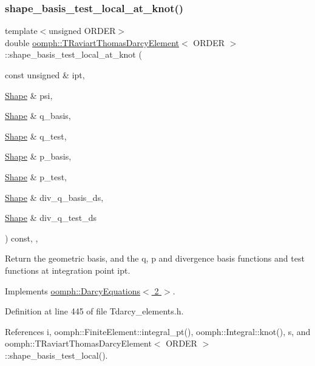 \subsubsection{\texorpdfstring{shape\+\_\+basis\+\_\+test\+\_\+local\+\_\+at\+\_\+knot()}{shape\_basis\_test\_local\_at\_knot()}}
{\footnotesize\ttfamily template$<$unsigned O\+R\+D\+ER$>$ \\
double \hyperlink{classoomph_1_1TRaviartThomasDarcyElement}{oomph\+::\+T\+Raviart\+Thomas\+Darcy\+Element}$<$ O\+R\+D\+ER $>$\+::shape\+\_\+basis\+\_\+test\+\_\+local\+\_\+at\+\_\+knot (\begin{DoxyParamCaption}\item[{const unsigned \&}]{ipt,  }\item[{\hyperlink{classoomph_1_1Shape}{Shape} \&}]{psi,  }\item[{\hyperlink{classoomph_1_1Shape}{Shape} \&}]{q\+\_\+basis,  }\item[{\hyperlink{classoomph_1_1Shape}{Shape} \&}]{q\+\_\+test,  }\item[{\hyperlink{classoomph_1_1Shape}{Shape} \&}]{p\+\_\+basis,  }\item[{\hyperlink{classoomph_1_1Shape}{Shape} \&}]{p\+\_\+test,  }\item[{\hyperlink{classoomph_1_1Shape}{Shape} \&}]{div\+\_\+q\+\_\+basis\+\_\+ds,  }\item[{\hyperlink{classoomph_1_1Shape}{Shape} \&}]{div\+\_\+q\+\_\+test\+\_\+ds }\end{DoxyParamCaption}) const\hspace{0.3cm}{\ttfamily [inline]}, {\ttfamily [protected]}, {\ttfamily [virtual]}}



Return the geometric basis, and the q, p and divergence basis functions and test functions at integration point ipt. 



Implements \hyperlink{classoomph_1_1DarcyEquations_a43dc36e25fe5eed15066f50e4122c42b}{oomph\+::\+Darcy\+Equations$<$ 2 $>$}.



Definition at line 445 of file Tdarcy\+\_\+elements.\+h.



References i, oomph\+::\+Finite\+Element\+::integral\+\_\+pt(), oomph\+::\+Integral\+::knot(), s, and oomph\+::\+T\+Raviart\+Thomas\+Darcy\+Element$<$ O\+R\+D\+E\+R $>$\+::shape\+\_\+basis\+\_\+test\+\_\+local().

\mbox{\label{classoomph_1_1TRaviartThomasDarcyElement_a210a7eb47fff529cd80d7203d6c76865}} 
